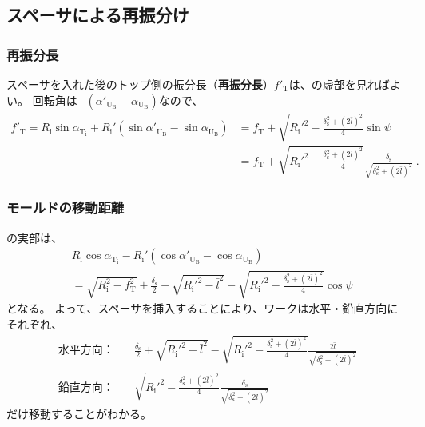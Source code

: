 \subsection{スペーサによる再振分け}

\subsubsection{再振分長}
スペーサを入れた後のトップ側の振分長（\textbf{再振分長}）$f'_\mathrm T$は、の虚部を見ればよい。
回転角は$-(\alpha'_{\mathrm U_\mathrm B}-\alpha_{\mathrm U_\mathrm B})$なので、
\begin{align*}
  f'_\mathrm T
  = R_\mathrm i\sin\alpha_{\mathrm T_\mathrm i}
    +R_\mathrm i'\left(\sin\alpha'_{\mathrm U_\mathrm B}-\sin\alpha_{\mathrm U_\mathrm B}\right)
  &= f_\mathrm T+\sqrt{R_\mathrm i'^2-\frac{\delta_\mathrm s^2+(2\bar l)^2}4}\sin\psi\\
  &= f_\mathrm T+\sqrt{R_\mathrm i'^2-\frac{\delta_\mathrm s^2+(2\bar l)^2}4}\frac{\delta_\mathrm s}{\sqrt{\delta_\mathrm s^2+(2\bar l)^2}}\ .
\end{align*}

\subsubsection{モールドの移動距離}
の実部は、
\begin{align*}
  & R_\mathrm i\cos\alpha_{\mathrm T_\mathrm i}
    -R_\mathrm i'(\cos\alpha'_{\mathrm U_\mathrm B}-\cos\alpha_{\mathrm U_\mathrm B})\\
  & = \sqrt{R_\mathrm i^2-f_\mathrm T^2}+\frac{\delta_\mathrm s}2+\sqrt{R_\mathrm i'^2-\bar l^2}
      -\sqrt{R_\mathrm i'^2-\frac{\delta_\mathrm s^2+(2\bar l)^2}4}\cos\psi
\end{align*}
となる。
よって、スペーサを挿入することにより、ワークは水平・鉛直方向にそれぞれ、
\begin{subequations}
\begin{alignat}{2}
  \label{eq:spacerMoveHdistance}
  \text{水平方向：}\quad
  & \frac{\delta_\mathrm s}2+\sqrt{R_\mathrm i'^2-\bar l^2}-\sqrt{R_\mathrm i'^2-\frac{\delta_\mathrm s^2+(2\bar l)^2}4}\frac{2\bar l}{\sqrt{\delta_\mathrm s^2+(2\bar l)^2}}\\
  \text{鉛直方向：}\quad
  & \sqrt{R_\mathrm i'^2-\frac{\delta_\mathrm s^2+(2\bar l)^2}4}\frac{\delta_\mathrm s}{\sqrt{\delta_\mathrm s^2+(2\bar l)^2}}
\end{alignat}
\end{subequations}
だけ移動することがわかる。


